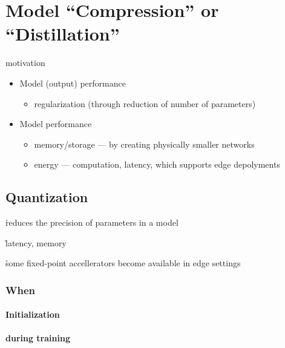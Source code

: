 \chapter{Model ``Compression'' or ``Distillation''}
motivation


\begin{itemize}[noitemsep,topsep=0pt]
	\item Model (output) performance
	\begin{itemize}[noitemsep,topsep=0pt]
		\item regularization (through reduction of number of parameters)
	\end{itemize}
	\item Model performance
	\begin{itemize}[noitemsep,topsep=0pt]
		\item memory/storage --- by creating physically smaller networks
		\item energy --- computation, latency, which supports edge depolyments
	\end{itemize}
\end{itemize}



\section{Quantization}


\r{reduces the precision of parameters in a model}

\r{latency, memory}

\r{some fixed-point accellerators become available in edge settings}

\subsection{When}

\subsubsection{Initialization}



\subsubsection{during training}

